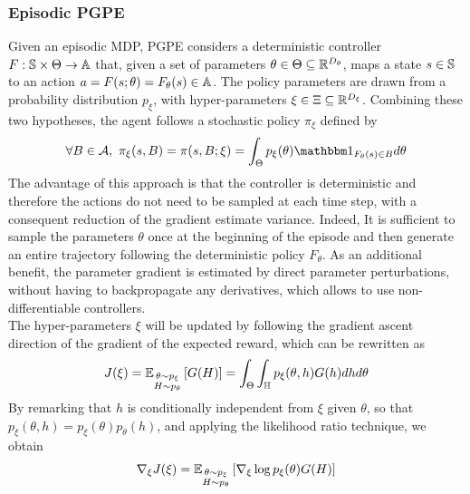 \subsubsection{Episodic PGPE}
Given an episodic \gls{MDP}, \gls{PGPE} considers a deterministic controller $F: \S \times \Theta \to \A$ that, given a set of parameters $\theta \in \Theta \subseteq
\R^{D_\theta}$, maps a state $s \in \S$ to an action $a = F(s; \theta) =
F_\theta(s) \in \A$. The policy parameters are drawn from a probability distribution $p_\xi$, with hyper-parameters $\xi \in \Xi \subseteq \R^{D_\xi}$. Combining these two
hypotheses, the agent follows a stochastic policy $\pi_\xi$ defined by
\begin{equation*}
	\forall B \in \calA ,\ \pi_\xi(s,B) = \pi(s, B; \xi) = \int_\Theta p_\xi(\theta) 
	\ind{F_{\theta}(s)\in B} d\theta
\end{equation*}
The advantage of this approach is that the controller is deterministic and
therefore the actions do not need to be sampled at each time step, with a
consequent reduction of the gradient estimate variance. Indeed, It is
sufficient to sample the parameters $\theta$ once at the beginning of the
episode and then generate an entire trajectory following the deterministic 
policy $F_\theta$. As an additional benefit, the parameter gradient is
estimated by direct parameter perturbations, without having to backpropagate
any derivatives, which allows to use non-differentiable controllers.\\
The hyper-parameters $\xi$ will be updated by following the gradient ascent direction of the gradient of the expected reward, which can be rewritten as 
\begin{equation}
	\begin{split}
		J(\xi) = \E[\substack{\theta \sim p_\xi\\H \sim p_\theta}]{G(H)} =
		\int_\Theta \int_\H p_\xi(\theta, h) G(h) dh d\theta\\
	\end{split}
\end{equation}
By remarking that $h$ is conditionally independent from $\xi$ given $\theta$, so that $p_\xi(\theta, h) = p_\xi(\theta) p_\theta(h)$, and applying the likelihood ratio technique, we obtain
\begin{equation}
	\begin{split}
		\nabla_\xi J(\xi) = \E[\substack{\theta \sim p_\xi\\H \sim p_\theta}]{\nabla_\xi \log p_\xi(\theta) G(H)}
	\end{split}
\end{equation}
